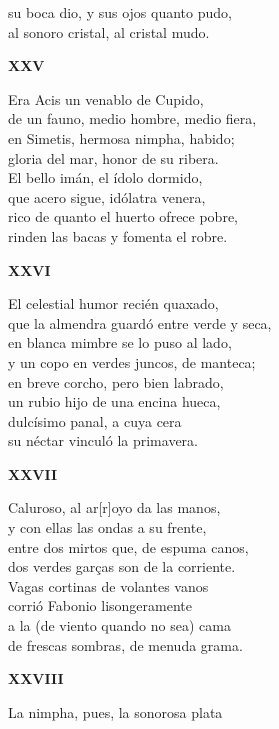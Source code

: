 \documentclass[11pt,twoside]{article}
\begin{document}
su boca dio, y sus ojos quanto pudo,\\
al sonoro cristal, al cristal mudo.\par\poend
%
\begin{center}
	\textbf{XXV}
\end{center}\postart
Era Acis un venablo de Cupido,\\
de un fauno, medio hombre, medio fiera,\\
en Simetis, hermosa nimpha, habido;\\
gloria del mar, honor de su ribera.\\
El bello imán, el ídolo dormido,\\
que acero sigue, idólatra venera,\\
rico de quanto el huerto ofrece pobre,\\
rinden las bacas y fomenta el robre.\par\poend
%
\begin{center}
	\textbf{XXVI}
\end{center}\postart
El celestial humor recién quaxado,\\
que la almendra guardó entre verde y seca,\\
en blanca mimbre se lo puso al lado,\\
y un copo en verdes juncos, de manteca;\\
en breve corcho, pero bien labrado,\\
un rubio hijo de una encina hueca,\\
dulcísimo panal, a cuya cera\\
su néctar vinculó la primavera.\par\poend
%
\begin{center}
	\textbf{XXVII}
\end{center}\postart
Caluroso, al ar[r]oyo da las manos,\\
y con ellas las ondas a su frente,\\
entre dos mirtos que, de espuma canos,\\
dos verdes garças son de la corriente.\\
Vagas cortinas de volantes vanos\\
corrió Fabonio lisongeramente\\
a la (de viento quando no sea) cama\\
de frescas sombras, de menuda grama.\par\poend
%
\begin{center}
	\textbf{XXVIII}
\end{center}\postart
La nimpha, pues, la sonorosa plata\\
\end{document}
